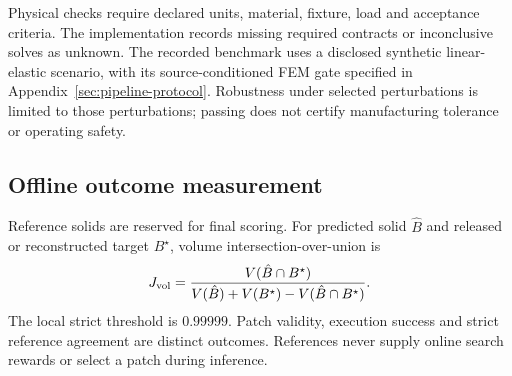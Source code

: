 Physical checks require declared units, material, fixture, load and acceptance criteria. The implementation records missing required contracts or inconclusive solves as unknown. The recorded benchmark uses a disclosed synthetic linear-elastic scenario, with its source-conditioned FEM gate specified in Appendix~\ref{sec:pipeline-protocol}. Robustness under selected perturbations is limited to those perturbations; passing does not certify manufacturing tolerance or operating safety.

\subsection{Offline outcome measurement}
Reference solids are reserved for final scoring. For predicted solid $\hat B$ and released or reconstructed target $B^\star$, volume intersection-over-union is
\begin{equation}
J_{\rm vol}=\frac{V(\hat B\cap B^\star)}{V(\hat B)+V(B^\star)-V(\hat B\cap B^\star)}.
\end{equation}
The local strict threshold is $0.99999$. Patch validity, execution success and strict reference agreement are distinct outcomes. References never supply online search rewards or select a patch during inference.
